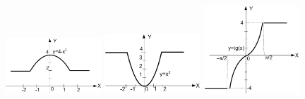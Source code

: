 \begin{figure}[h]%
\begin{floatrow}[3]
{\includegraphics[width=0.32\textwidth,keepaspectratio]{img/ris_3_42}}
{\includegraphics[width=0.32\textwidth,keepaspectratio]{img/ris_3_43}}
{\includegraphics[width=0.32\textwidth,keepaspectratio]{img/ris_3_44}}
\end{floatrow}
\end{figure}%

